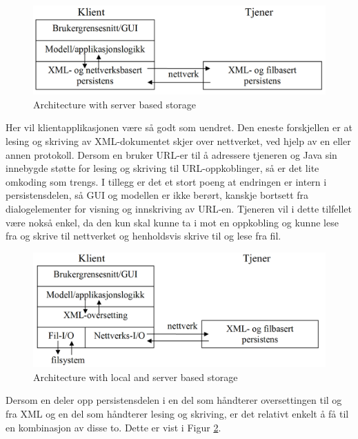 \begin{figure}[H]
    \centering
    \includegraphics[scale=0.35]{resources/simple-server-based-storage-architecture.PNG}
    \caption{Architecture with server based storage}
    \label{fig:simple-server-based-storage-architecture}
\end{figure}

Her vil klientapplikasjonen være så godt som uendret. Den eneste forskjellen er at lesing og skriving av XML-dokumentet skjer over nettverket, ved hjelp av en eller annen protokoll. Dersom en bruker URL-er til å adressere tjeneren og Java sin innebygde støtte for lesing og skriving til URL-oppkoblinger, så er det lite omkoding som trengs. I tillegg er det et stort poeng at endringen er intern i persistensdelen, så GUI og modellen er ikke berørt, kanskje bortsett fra dialogelementer for visning og innskriving av URL-en.
Tjeneren vil i dette tilfellet være nokså enkel, da den kun skal kunne ta i mot en oppkobling og kunne lese fra og skrive til nettverket og henholdsvis skrive til og lese fra fil.

\begin{figure}[H]
    \centering
    \includegraphics[scale=0.35]{resources/file-and-server-storage-architecture.PNG}
    \caption{Architecture with local and server based storage}
    \label{fig:file-and-server-storage-architecture}
\end{figure}

Dersom en deler opp persistensdelen i en del som håndterer oversettingen til og fra XML og en del som håndterer lesing og skriving, er det relativt enkelt å få til en kombinasjon av disse to. Dette er vist i Figur \ref{fig:file-and-server-storage-architecture}.


